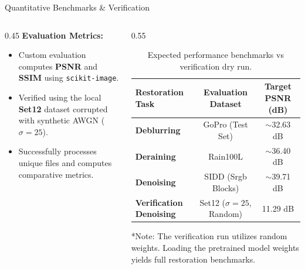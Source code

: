 \documentclass[aspectratio=169]{beamer}
\begin{document}
\begin{frame}{Quantitative Benchmarks \& Verification}
    \begin{columns}
        \begin{column}{0.45\textwidth}
            \textbf{Evaluation Metrics:}
            \begin{itemize}
                \item Custom evaluation computes \textbf{PSNR} and \textbf{SSIM} using \texttt{scikit-image}.
                \item Verified using the local \textbf{Set12} dataset corrupted with synthetic AWGN ($\sigma=25$).
                \item Successfully processes unique files and computes comparative metrics.
            \end{itemize}
        \end{column}
        \begin{column}{0.55\textwidth}
            \begin{table}
                \centering
                \small
                \begin{tabular}{lcc}
                    \toprule
                    \textbf{Restoration Task} & \textbf{Evaluation Dataset} & \textbf{Target PSNR (dB)} \\
                    \midrule
                    \textbf{Deblurring} & GoPro (Test Set) & $\sim$32.63 dB \\
                    \textbf{Deraining}  & Rain100L         & $\sim$36.40 dB \\
                    \textbf{Denoising}  & SIDD (Srgb Blocks) & $\sim$39.71 dB \\
                    \midrule
                    \textbf{Verification Denoising} & Set12 ($\sigma=25$, Random) & 11.29 dB \\
                    \bottomrule
                \end{tabular}
                \caption{Expected performance benchmarks vs verification dry run.}
            \end{table}
            \centering
            \tiny{*Note: The verification run utilizes random weights. Loading the pretrained model weights yields full restoration benchmarks.}
        \end{column}
    \end{columns}
\end{frame}
\end{document}
